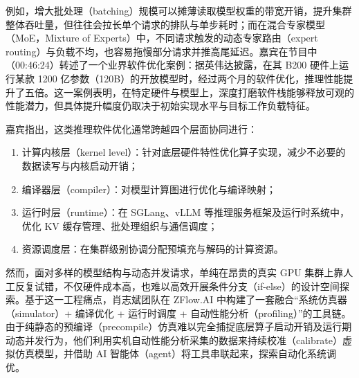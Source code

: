 \documentclass[UTF8,a4paper,11pt,fontset=fandol]{ctexart}
\begin{document}
例如，增大批处理（batching）规模可以摊薄读取模型权重的带宽开销，提升集群整体吞吐量，但往往会拉长单个请求的排队与单步耗时；而在混合专家模型（MoE，Mixture of Experts）中，不同请求触发的动态专家路由（expert routing）与负载不均，也容易拖慢部分请求并推高尾延迟。嘉宾在节目中（00:46:24）转述了一个业界软件优化案例：据英伟达披露，在其 B200 硬件上运行某款 1200 亿参数（120B）的开放模型时，经过两个月的软件优化，推理性能提升了五倍。这一案例表明，在特定硬件与模型上，深度打磨软件栈能够释放可观的性能潜力，但具体提升幅度仍取决于初始实现水平与目标工作负载特征。

嘉宾指出，这类推理软件优化通常跨越四个层面协同进行：
\begin{enumerate}
\item 计算内核层（kernel level）：针对底层硬件特性优化算子实现，减少不必要的数据读写与内核启动开销；
\item 编译器层（compiler）：对模型计算图进行优化与编译映射；
\item 运行时层（runtime）：在 SGLang、vLLM 等推理服务框架及运行时系统中，优化 KV 缓存管理、批处理组织与通信调度；
\item 资源调度层：在集群级别协调分配预填充与解码的计算资源。
\end{enumerate}

然而，面对多样的模型结构与动态并发请求，单纯在昂贵的真实 GPU 集群上靠人工反复试错，不仅硬件成本高，也难以高效开展条件分支（if-else）的设计空间探索。基于这一工程痛点，肖志斌团队在 ZFlow.AI 中构建了一套融合“系统仿真器（simulator）+ 编译优化 + 运行时调度 + 自动性能分析（profiling）”的工具链。由于纯静态的预编译（precompile）仿真难以完全捕捉底层算子启动开销及运行期动态并发行为，他们利用实机自动性能分析采集的数据来持续校准（calibrate）虚拟仿真模型，并借助 AI 智能体（agent）将工具串联起来，探索自动化系统调优。
\end{document}
